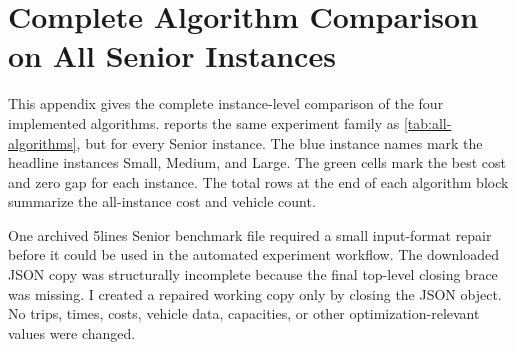 \chapter{Complete Algorithm Comparison on All Senior Instances}
\label{app:algorithm-details}
\label{app:complete-algorithm-table}

This appendix gives the complete instance-level comparison of the four
implemented algorithms.  reports the same
experiment family as \cref{tab:all-algorithms}, but for every Senior instance.
The blue instance names mark the headline instances Small, Medium, and Large.
The green cells mark the best cost and zero gap for each instance. The total
rows at the end of each algorithm block summarize the all-instance cost and
vehicle count.

One archived 5lines Senior benchmark file required a small input-format repair
before it could be used in the automated experiment workflow. The downloaded JSON copy was
structurally incomplete because the final top-level closing brace was missing.
I created a repaired working copy only by closing the JSON object. No trips,
times, costs, vehicle data, capacities, or other optimization-relevant values
were changed.


